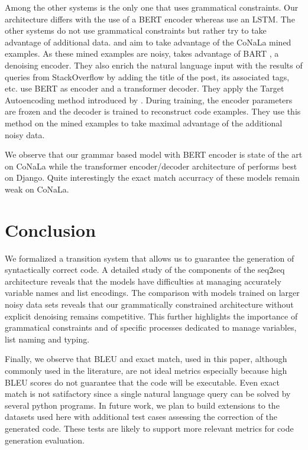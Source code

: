 \documentclass[11pt]{article}
\begin{document}
Among the other systems \citet{tranx-2018} is the only one that uses grammatical constraints. Our architecture differs with the use of a BERT  encoder whereas \citet{tranx-2018} use an LSTM.
The other systems do not use grammatical constraints but rather try to take advantage of additional data.  \citet{orlanski-21} and \citet{monolingualdata} aim to take advantage of the {\selectfont CoNaLa} mined examples. As these mined examples are noisy, \citet{orlanski-21} takes advantage of BART \cite{BART}, a denoising encoder. They also enrich the natural language input with the results of queries from StackOverflow by adding the title of the post, its associated tags, etc.
\citet{monolingualdata} use  BERT as encoder and a transformer decoder. They apply the Target Autoencoding method introduced by \citet{TAE}. During training, the encoder parameters are frozen and the decoder is trained to reconstruct code examples. They use this method on the mined examples to take maximal advantage of the additional noisy data.

We observe that our grammar based model with BERT encoder is state of the art on {\selectfont CoNaLa} while the transformer encoder/decoder architecture of \citet{monolingualdata} performs best on {\selectfont Django}. Quite interestingly the exact match accurracy of these models remain weak on {\selectfont CoNaLa}.









\section{Conclusion}

We formalized a transition system that allows us to guarantee the generation of syntactically correct code. A detailed study of the components of the seq2seq architecture reveals that the models have difficulties at managing accurately variable names and list encodings. The comparison with models trained on larger noisy data sets reveals that our grammatically constrained architecture without explicit denoising remains competitive. This further highlights the importance of grammatical constraints and of specific processes dedicated to manage variables, list naming and typing. 

Finally, we observe that BLEU and exact match, used in this paper, although commonly used in the literature, are not ideal metrics especially
because high BLEU scores do not guarantee that the code will be executable. Even exact match is not satifactory since a single natural language query can be solved by several python programs.
In future work, we plan to 
 build extensions to the datasets used here with additional test cases assessing the correction of the generated code.
These tests are likely to support more relevant metrics for  code generation evaluation. 
\end{document}
